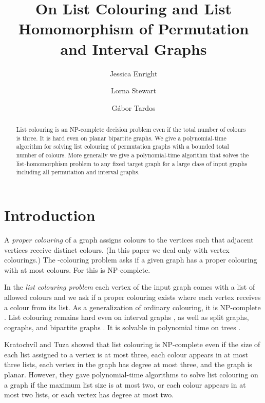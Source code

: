 \documentclass[12pt]{llncs}
\title{On List Colouring and List Homomorphism of Permutation and Interval Graphs}
\author{Jessica Enright  \inst{1} \and Lorna Stewart \inst{1} \and G\'{a}bor Tardos \inst{2}}
\institute{University of Alberta\\ \and Simon Fraser University and R\'enyi Institute }
\date{}
\begin{document}
\newenvironment{my_enumerate}{
\begin{enumerate}
  \setlength{\itemsep}{1pt}
  \setlength{\parskip}{0pt}
  \setlength{\parsep}{0pt}}
  {\end{enumerate}
}
\newenvironment{my_itemize}{
\begin{itemize}
  \setlength{\itemsep}{1pt}
  \setlength{\parskip}{0pt}
  \setlength{\parsep}{0pt}}
  {\end{itemize}
}
\newenvironment{my_proof}{   
\begin{proof} 
     }
     {  \end{proof}
}

\maketitle

\begin{abstract}
List colouring is an NP-complete decision problem even if the total number of
colours is three.  It is hard even on planar bipartite graphs.  We give a
polynomial-time algorithm for solving list colouring of permutation graphs
with a bounded total number of colours. More generally we give a
polynomial-time algorithm that solves the list-homomorphism problem to any
fixed target graph for a large class of input graphs including all permutation
and interval graphs.
\end{abstract}

\section{Introduction}
A {\em proper colouring} of a graph assigns colours to the vertices such that adjacent vertices receive distinct colours. (In this paper we deal only with vertex colourings.) The {-colouring problem} asks if a given graph has a proper colouring with at most  colours. For  this is NP-complete. 

In the {\em list colouring problem} each vertex of the input graph comes with a list of allowed colours and we ask if a proper colouring exists where each vertex receives a colour from its list. As a generalization of ordinary colouring, it is NP-complete \cite{toft}.  List colouring remains hard even on interval graphs \cite{biro1992}, as well as split graphs, cographs, and bipartite graphs \cite{jansenScheffler}.  It is solvable in polynomial time on trees \cite{jansenScheffler}.

Kratochv\'il and Tuza \cite{kratochvilTuza} showed that list colouring is NP-complete even if the size of each list assigned to a vertex is at most three, each colour appears in at most three lists, each vertex in the graph has degree at most three, and the graph is planar.  However, they gave polynomial-time algorithms to solve list colouring on a graph if the maximum list size is at most two, or each colour appears in at most two lists, or each vertex has degree at most two.
\end{document}
